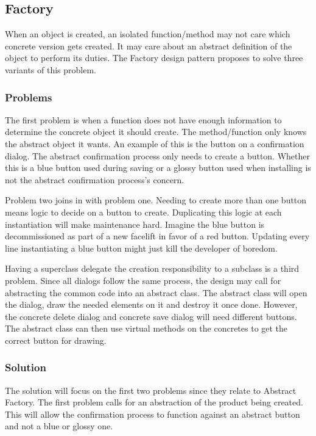 \subsection{Factory}
When an object is created, an isolated function/method may not care which concrete version gets created.
It may care about an abstract definition of the object to perform its duties.
The Factory design pattern proposes to solve three variants of this problem. \cite{gamma_94_01}

\subsubsection{Problems}
The first problem is when a function does not have enough information to determine the concrete object it should create.
The method/function only knows the abstract object it wants.
An example of this is the button on a confirmation dialog.
The abstract confirmation process only needs to create a button.
Whether this is a blue button used during saving or a glossy button used when installing is not the abstract confirmation process's concern.

Problem two joins in with problem one.
Needing to create more than one button means logic to decide on a button to create.
Duplicating this logic at each instantiation will make maintenance hard.
Imagine the blue button is decommissioned as part of a new facelift in favor of a red button.
Updating every line instantiating a blue button might just kill the developer of boredom.

Having a superclass delegate the creation responsibility to a subclass is a third problem.
Since all dialogs follow the same process, the design may call for abstracting the common code into an abstract class.
The abstract class will open the dialog, draw the needed elements on it and destroy it once done.
However, the concrete delete dialog and concrete save dialog will need different buttons.
The abstract class can then use virtual methods on the concretes to get the correct button for drawing.

\subsubsection{Solution}
The solution will focus on the first two problems since they relate to Abstract Factory.
The first problem calls for an abstraction of the product being created.
This will allow the confirmation process to function against an abstract button and not a blue or glossy one.

